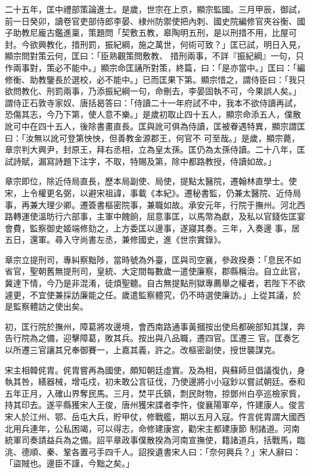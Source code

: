 \begin{pinyinscope}
 二十五年，匡中禮部策論進士。是歲，世宗在上京，顯宗監國。三月甲辰，御試，前一日癸卯，讀卷官吏部侍郎李晏、棣州防禦使把內刺、國史院編修官夾谷衡、國子助教尼龐古鑑進稟，策題問「契敷五教，皋陶明五刑，是以刑措不用，比屋可封。今欲興教化，措刑罰，振紀綱，施之萬世，何術可致？」匡已試，明日入見，顯宗問對策云何，匡曰：「臣熟觀策問敷教、
 措刑兩事，不詳『振紀綱』一句，只作兩事對，策必不能中。」顯宗命匡誦所對策，終篇，曰：「是亦當中。」匡曰：「編修衡、助教鑒長於選校，必不能中。」已而匡果下第。顯宗惜之，謂侍臣曰：「我只欲問教化、刑罰兩事，乃添振紀綱一句，命刪去，李晏固執不可，今果誤人矣。」謂侍正石敦寺家奴、唐括曷答曰：「侍讀二十一年府試不中，我本不欲侍讀再試，恐傷其志，今乃下第，使人意不樂。」是歲初取止四十五人，顯宗命添五人，僕散訛可中在四十五人，後除書畫直長。匡與訛可俱為侍讀，匡被眷遇特異，顯宗謂匡曰：「汝無以訛可登第怏怏，但善教金源郡王，何官不
 可至哉。」是歲，顯宗薨，章宗判大興尹，封原王，拜右丞相，立為皇太孫。匡仍為太孫侍讀。二十八年，匡試詩賦，漏寫詩題下注字，不取，特賜及第，除中都路教授，侍讀如故。」



 章宗即位，除近侍局直長，歷本局副使、局使，提點太醫院，遷翰林直學士。使宋，上令權更名弼，以避宋祖諱，事載《本紀》。遷秘書監，仍兼太醫院、近侍局事，再兼大理少卿。遷簽書樞密院事，兼職如故。承安元年，行院于撫州。河北西路轉運使溫昉行六部事，主軍中餽餉，屈意事匡，以馬幣為獻，及私以官錢佐匡宴會費，監察御史姬端修劾之，上方委匡以邊事，遂寢其奏。三年，入奏邊
 事，居五日，還軍。尋入守尚書左丞，兼修國史，進《世宗實錄》。



 章宗立提刑司，專糾察黜陟，當時號為外臺，匡與司空襄，參政揆奏：「息民不如省官，聖朝舊無提刑司，皇統、大定間每數歲一遣使廉察，郡縣稱治。自立此官，冀達下情，今乃是非混淆，徒煩聖聽。自古無提點刑獄專薦舉之權者，若陛下不欲遽更，不宜使兼採訪廉能之任。歲遣監察體究，仍不時選使廉訪。」上從其議，於是監察體訪之使出矣。



 初，匡行院於撫州，障葛將攻邊境，會西南路通事黃摑按出使烏都碗部知其謀，奔告行院為之備，迎擊障葛，敗其兵。按出與八品職，遷四官。匡遷三
 官。匡奏乞以所遷三官讓其兄奉御賽一，上嘉其義，許之。改樞密副使，授世襲謀克。



 宋主相韓侂胄。侂胄嘗再為國使，頗知朝廷虛實。及為相，與蘇師旦倡議復仇，身執其咎，繕器械，增屯戍，初未敢公言征伐，乃使邊將小小寇鈔以嘗試朝廷。泰和五年正月，入確山界奪民馬。三月，焚平氏鎮，剽民財物，掠鄧州白亭巡檢家貲，持其印去。遂平縣獲宋人王俊，唐州獲宋諜者李忤，俊襄陽軍卒，忤建康人。俊言宋人於江州、鄂、岳屯大兵，貯甲仗，修戰艦，期以五月入寇。忤言侂胄謂大國西北用兵連年，公私困竭，可以得志，命修建康宮，勸宋主都建康節
 制諸道。河南統軍司奏請益兵為之備。詔平章政事僕散揆為河南宣撫使，籍諸道兵，括戰馬，臨洮、德順、秦、鞏各置弓手四千人。詔揆遺書宋人曰：「奈何興兵？」宋人辭曰：「盜賊也。邊臣不謹，今黜之矣。」




\end{pinyinscope}
